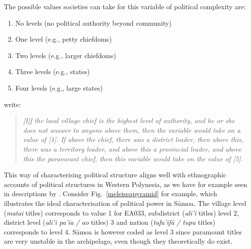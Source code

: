 \documentclass[12pt,letterpaper]{article}
\begin{document}
The possible values societies can take for this variable of political complexity are:

\begin{enumerate}
\item No levels (no political authority beyond community)
\item One level (e.g., petty chiefdoms)
\item Two levels (e.g., larger chiefdoms)
\item Three levels (e.g., states) 
\item Four levels (e.g., large states)
\end{enumerate}

\citet{giuliano2018ancestral} write: 

\begin{quotation}
\noindent\emph{[I]f the local village chief is the highest level of authority, and he or she does not answer to anyone above them, then the variable would take on a value of [1]. If above the chief, there was a district leader, then above this, there was a territory leader, and above this a provincial leader, and above this the paramount chief, then this variable would take on the value of [5].} 
\begin{flushright}
\citet[9]{giuliano2018ancestral}
\end{flushright}
\end{quotation}

This way of characterising political structure aligns well with ethnographic accounts of political structures in Western Polynesia, as we have for example seen in descriptions by \citet{sahlins63}. Consider Fig.~\ref{meleiseapyramid} \citep[22]{meleisea1995} for example, which illustrates the ideal characterisation of political power in S\={a}moa. The village level (\emph{matai} titles) corresponds to value 1 for EA033, subdistrict (\emph{ali'i} titles) level 2, district level (\emph{ali'i pa'ia / ao} titles) 3 and nation (\emph{tafa'if\={a} / tupu} titles) corresponds to level 4. S\={a}moa is however coded as level 3 since paramount titles are very unstable in the archipelago, even though they theoretically do exist.

\end{document}
